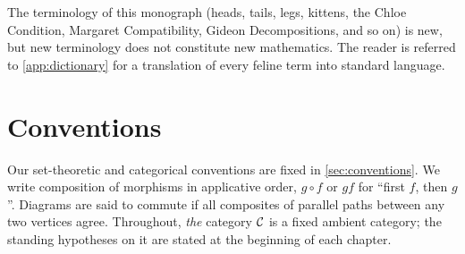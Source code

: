 The terminology of this monograph (heads, tails, legs, kittens, the Chloe
Condition, Margaret Compatibility, Gideon Decompositions, and so on) is new,
but new terminology does not constitute new mathematics. The reader is
referred to \cref{app:dictionary} for a translation of every feline term into
standard language.

\section{Conventions}

Our set-theoretic and categorical conventions are fixed in \cref{sec:conventions}.
We write composition of morphisms in applicative order, $g\circ f$ or $gf$
for ``first $f$, then $g$''. Diagrams are said to commute if all composites
of parallel paths between any two vertices agree. Throughout, \emph{the}
category $\mathcal{C}$ is a fixed ambient category; the standing hypotheses on it are
stated at the beginning of each chapter.
